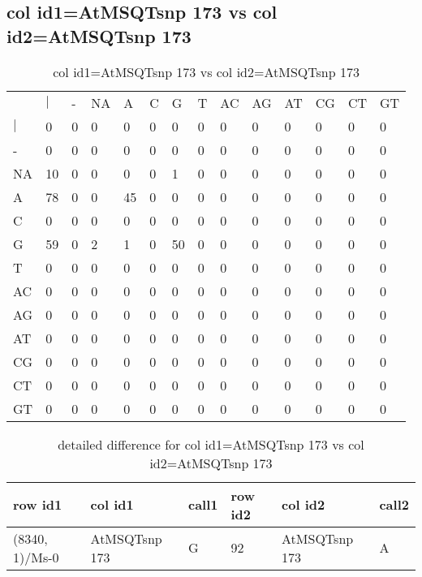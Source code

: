 \subsection{col id1=AtMSQTsnp 173 vs col id2=AtMSQTsnp 173}
\begin{center}
\begin{longtable}{|l|l|l|l|l|l|l|l|l|l|l|l|l|l|}
\caption{col id1=AtMSQTsnp 173 vs col id2=AtMSQTsnp 173} \label{table_dm552}\\
\hline
\\
\hline
&$|$&-&NA&A&C&G&T&AC&AG&AT&CG&CT&GT\\
$|$&0&0&0&0&0&0&0&0&0&0&0&0&0\\
-&0&0&0&0&0&0&0&0&0&0&0&0&0\\
NA&10&0&0&0&0&1&0&0&0&0&0&0&0\\
A&78&0&0&45&0&0&0&0&0&0&0&0&0\\
C&0&0&0&0&0&0&0&0&0&0&0&0&0\\
G&59&0&2&1&0&50&0&0&0&0&0&0&0\\
T&0&0&0&0&0&0&0&0&0&0&0&0&0\\
AC&0&0&0&0&0&0&0&0&0&0&0&0&0\\
AG&0&0&0&0&0&0&0&0&0&0&0&0&0\\
AT&0&0&0&0&0&0&0&0&0&0&0&0&0\\
CG&0&0&0&0&0&0&0&0&0&0&0&0&0\\
CT&0&0&0&0&0&0&0&0&0&0&0&0&0\\
GT&0&0&0&0&0&0&0&0&0&0&0&0&0\\
\hline
\end{longtable}
\end{center}

\begin{center}
\begin{longtable}{|l|l|l|l|l|l|}
\caption{detailed difference for col id1=AtMSQTsnp 173 vs col id2=AtMSQTsnp 173} \label{table_dm553}\\
\hline
row id1&col id1&call1&row id2&col id2&call2\\
\hline
(8340, 1)/Ms-0&AtMSQTsnp 173&G&92&AtMSQTsnp 173&A\\
\hline
\end{longtable}
\end{center}

